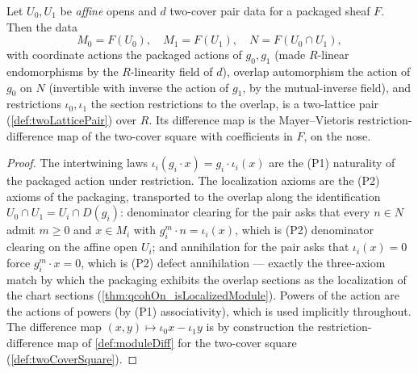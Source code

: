 \begin{definition}
  \label{def:twoCoverPairData_pair}
  \leanok
  Let \(U_0, U_1\) be \emph{affine} opens and \(d\) two-cover pair data for a packaged
  sheaf \(F\). Then the data
  \[
    M_0 = F(U_0), \quad M_1 = F(U_1), \quad N = F(U_0 \cap U_1),
  \]
  with coordinate actions the packaged actions of \(g_0, g_1\) (made \(R\)-linear
  endomorphisms by the \(R\)-linearity field of \(d\)), overlap automorphism the action
  of \(g_0\) on \(N\) (invertible with inverse the action of \(g_1\), by the
  mutual-inverse field), and restrictions \(\iota_0, \iota_1\) the section restrictions
  to the overlap, is a two-lattice pair (\ref{def:twoLatticePair}) over \(R\). Its
  difference map is the Mayer--Vietoris restriction-difference map of the two-cover
  square with coefficients in \(F\), on the nose.
\end{definition}
\begin{proof}
  \leanok
  The intertwining laws \(\iota_i(g_i \cdot x) = g_i \cdot \iota_i(x)\) are the
  (P1) naturality of the packaged action under restriction. The localization axioms are
  the (P2) axioms of the packaging, transported to the overlap along the identification
  \(U_0 \cap U_1 = U_i \cap D(g_i)\): denominator clearing for the pair asks that every
  \(n \in N\) admit \(m \ge 0\) and \(x \in M_i\) with \(g_i^m \cdot n =
  \iota_i(x)\), which is (P2) denominator clearing on the affine open \(U_i\); and
  annihilation for the pair asks that \(\iota_i(x) = 0\) force \(g_i^m \cdot x = 0\),
  which is (P2) defect annihilation --- exactly the three-axiom match by which the
  packaging exhibits the overlap sections as the localization of the chart sections
  (\ref{thm:qcohOn_isLocalizedModule}). Powers of the action are the actions of powers
  (by (P1) associativity), which is used implicitly throughout. The difference map
  \((x, y) \mapsto \iota_0 x - \iota_1 y\) is by construction the
  restriction-difference map of \ref{def:moduleDiff} for the two-cover square
  (\ref{def:twoCoverSquare}).
\end{proof}

